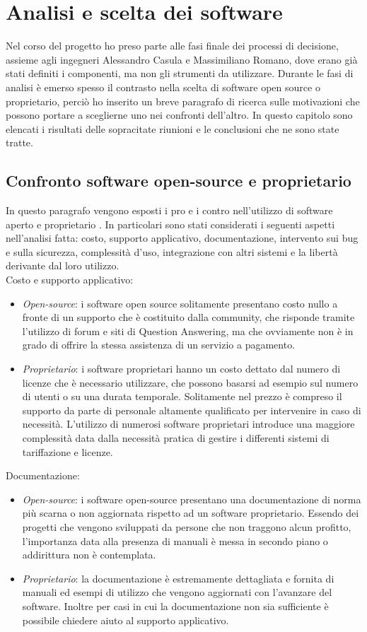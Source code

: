 \documentclass[a4paper, 12pt]{report}
\numberwithin{equation}{section}
\begin{document}
\chapter{Analisi e scelta dei software}\label{software}
Nel corso del progetto ho preso parte alle fasi finale dei processi di decisione, assieme agli ingegneri Alessandro Casula e Massimiliano Romano, dove erano già stati definiti i componenti, ma non gli strumenti da utilizzare. Durante le fasi di analisi è emerso spesso il contrasto nella scelta di software open source o proprietario, perciò ho inserito un breve paragrafo di ricerca sulle motivazioni che possono portare a sceglierne uno nei confronti dell'altro.  In questo capitolo sono elencati i risultati delle sopracitate riunioni e le conclusioni che ne sono state tratte.

\section{Confronto software open-source e proprietario}
In questo paragrafo vengono esposti i pro e i contro nell’utilizzo di software aperto e proprietario \cite{opensource-vs-proprietary}. In particolari sono stati considerati i seguenti aspetti nell’analisi fatta: costo, supporto applicativo, documentazione, intervento sui bug e sulla sicurezza, complessità d’uso, integrazione con altri sistemi e la libertà derivante dal loro utilizzo.\\
Costo e supporto applicativo:
\begin{itemize}
    \item \emph{Open-source}: i software open source solitamente presentano costo nullo a fronte di un supporto che è costituito dalla community, che risponde tramite l’utilizzo di forum e siti di Question Answering, ma che ovviamente non è in grado di offrire la stessa assistenza di un servizio a pagamento.
    \item \emph{Proprietario}: i software proprietari hanno un costo dettato dal numero di licenze che è necessario utilizzare, che possono basarsi ad esempio sul numero di utenti o su una durata temporale. Solitamente nel prezzo è compreso il supporto da parte di personale altamente qualificato per intervenire in caso di necessità. L’utilizzo di numerosi software proprietari introduce una maggiore complessità data dalla necessità pratica di gestire i differenti sistemi di tariffazione e licenze.
\end{itemize}
Documentazione:
\begin{itemize}
    \item \emph{Open-source}: i software open-source presentano una documentazione di norma più scarna o non aggiornata rispetto ad un software proprietario. Essendo dei progetti che vengono sviluppati da persone che non traggono alcun profitto, l’importanza data alla presenza di manuali è messa in secondo piano o addirittura non è contemplata.
    \item \emph{Proprietario}: la documentazione è estremamente dettagliata e fornita di manuali ed esempi di utilizzo che vengono aggiornati con l’avanzare del software. Inoltre per casi in cui la documentazione non sia sufficiente è possibile chiedere aiuto al supporto applicativo.
\end{itemize}
\end{document}
